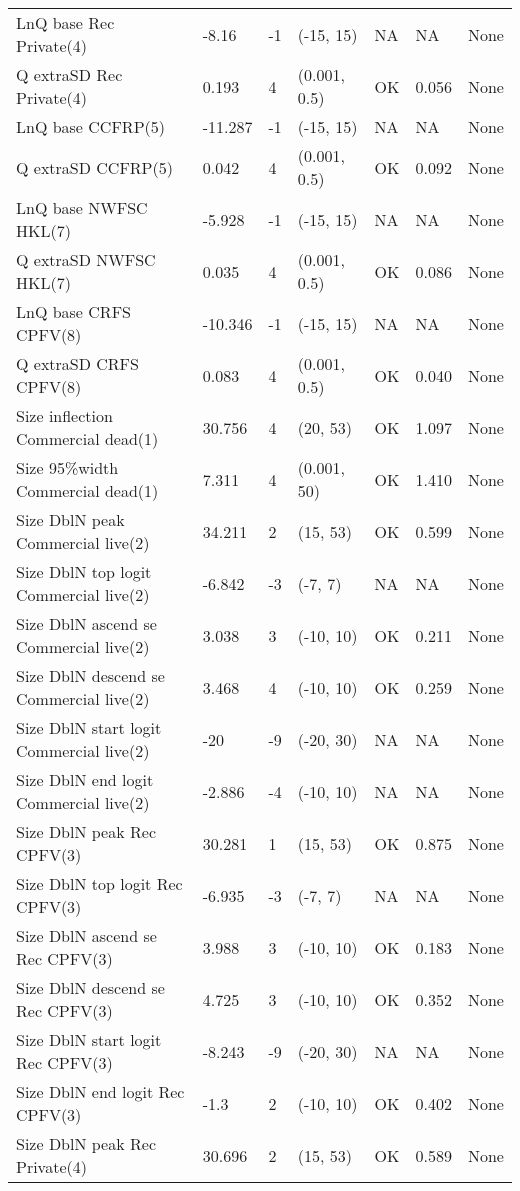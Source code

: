 \documentclass[11pt,
  english,
  letterpaper,
]{article}
\begin{document}
\begin{landscape}
\begin{longtable}[t]{>{\raggedright\arraybackslash}p{7.5cm}lllll>{\raggedright\arraybackslash}p{3.5cm}}
LnQ base Rec Private(4) & -8.16 & -1 & (-15, 15) & NA & NA & None\\
Q extraSD Rec Private(4) & 0.193 & 4 & (0.001, 0.5) & OK & 0.056 & None\\
LnQ base CCFRP(5) & -11.287 & -1 & (-15, 15) & NA & NA & None\\
Q extraSD CCFRP(5) & 0.042 & 4 & (0.001, 0.5) & OK & 0.092 & None\\
LnQ base NWFSC HKL(7) & -5.928 & -1 & (-15, 15) & NA & NA & None\\
Q extraSD NWFSC HKL(7) & 0.035 & 4 & (0.001, 0.5) & OK & 0.086 & None\\
LnQ base CRFS CPFV(8) & -10.346 & -1 & (-15, 15) & NA & NA & None\\
Q extraSD CRFS CPFV(8) & 0.083 & 4 & (0.001, 0.5) & OK & 0.040 & None\\
Size inflection Commercial dead(1) & 30.756 & 4 & (20, 53) & OK & 1.097 & None\\
Size 95\%width Commercial dead(1) & 7.311 & 4 & (0.001, 50) & OK & 1.410 & None\\
Size DblN peak Commercial live(2) & 34.211 & 2 & (15, 53) & OK & 0.599 & None\\
Size DblN top logit Commercial live(2) & -6.842 & -3 & (-7, 7) & NA & NA & None\\
Size DblN ascend se Commercial live(2) & 3.038 & 3 & (-10, 10) & OK & 0.211 & None\\
Size DblN descend se Commercial live(2) & 3.468 & 4 & (-10, 10) & OK & 0.259 & None\\
Size DblN start logit Commercial live(2) & -20 & -9 & (-20, 30) & NA & NA & None\\
Size DblN end logit Commercial live(2) & -2.886 & -4 & (-10, 10) & NA & NA & None\\
Size DblN peak Rec CPFV(3) & 30.281 & 1 & (15, 53) & OK & 0.875 & None\\
Size DblN top logit Rec CPFV(3) & -6.935 & -3 & (-7, 7) & NA & NA & None\\
Size DblN ascend se Rec CPFV(3) & 3.988 & 3 & (-10, 10) & OK & 0.183 & None\\
Size DblN descend se Rec CPFV(3) & 4.725 & 3 & (-10, 10) & OK & 0.352 & None\\
Size DblN start logit Rec CPFV(3) & -8.243 & -9 & (-20, 30) & NA & NA & None\\
Size DblN end logit Rec CPFV(3) & -1.3 & 2 & (-10, 10) & OK & 0.402 & None\\
Size DblN peak Rec Private(4) & 30.696 & 2 & (15, 53) & OK & 0.589 & None\\

\end{longtable}
\end{landscape}
\end{document}

